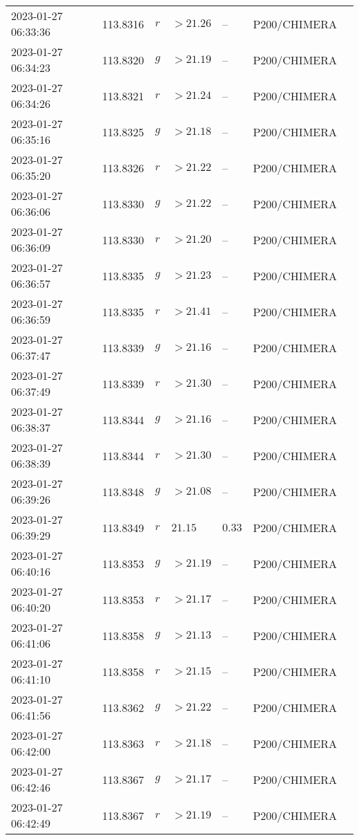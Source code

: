 \documentclass{nature_plusfigure}
\begin{document}
\begin{supplement}
\begin{center}
\begin{longtable}{lllllll}
2023-01-27 06:33:36 & 113.8316 & $r$ & $>21.26$ & -- & P200/CHIMERA &  \\ 
2023-01-27 06:34:23 & 113.8320 & $g$ & $>21.19$ & -- & P200/CHIMERA &  \\ 
2023-01-27 06:34:26 & 113.8321 & $r$ & $>21.24$ & -- & P200/CHIMERA &  \\ 
2023-01-27 06:35:16 & 113.8325 & $g$ & $>21.18$ & -- & P200/CHIMERA &  \\ 
2023-01-27 06:35:20 & 113.8326 & $r$ & $>21.22$ & -- & P200/CHIMERA &  \\ 
2023-01-27 06:36:06 & 113.8330 & $g$ & $>21.22$ & -- & P200/CHIMERA &  \\ 
2023-01-27 06:36:09 & 113.8330 & $r$ & $>21.20$ & -- & P200/CHIMERA &  \\ 
2023-01-27 06:36:57 & 113.8335 & $g$ & $>21.23$ & -- & P200/CHIMERA &  \\ 
2023-01-27 06:36:59 & 113.8335 & $r$ & $>21.41$ & -- & P200/CHIMERA &  \\ 
2023-01-27 06:37:47 & 113.8339 & $g$ & $>21.16$ & -- & P200/CHIMERA &  \\ 
2023-01-27 06:37:49 & 113.8339 & $r$ & $>21.30$ & -- & P200/CHIMERA &  \\ 
2023-01-27 06:38:37 & 113.8344 & $g$ & $>21.16$ & -- & P200/CHIMERA &  \\ 
2023-01-27 06:38:39 & 113.8344 & $r$ & $>21.30$ & -- & P200/CHIMERA &  \\ 
2023-01-27 06:39:26 & 113.8348 & $g$ & $>21.08$ & -- & P200/CHIMERA &  \\ 
2023-01-27 06:39:29 & 113.8349 & $r$ & $21.15$ & $0.33$ & P200/CHIMERA &  \\ 
2023-01-27 06:40:16 & 113.8353 & $g$ & $>21.19$ & -- & P200/CHIMERA &  \\ 
2023-01-27 06:40:20 & 113.8353 & $r$ & $>21.17$ & -- & P200/CHIMERA &  \\ 
2023-01-27 06:41:06 & 113.8358 & $g$ & $>21.13$ & -- & P200/CHIMERA &  \\ 
2023-01-27 06:41:10 & 113.8358 & $r$ & $>21.15$ & -- & P200/CHIMERA &  \\ 
2023-01-27 06:41:56 & 113.8362 & $g$ & $>21.22$ & -- & P200/CHIMERA &  \\ 
2023-01-27 06:42:00 & 113.8363 & $r$ & $>21.18$ & -- & P200/CHIMERA &  \\ 
2023-01-27 06:42:46 & 113.8367 & $g$ & $>21.17$ & -- & P200/CHIMERA &  \\ 
2023-01-27 06:42:49 & 113.8367 & $r$ & $>21.19$ & -- & P200/CHIMERA &  \\ 

\end{longtable}
\end{center}
\end{supplement}
\end{document}
